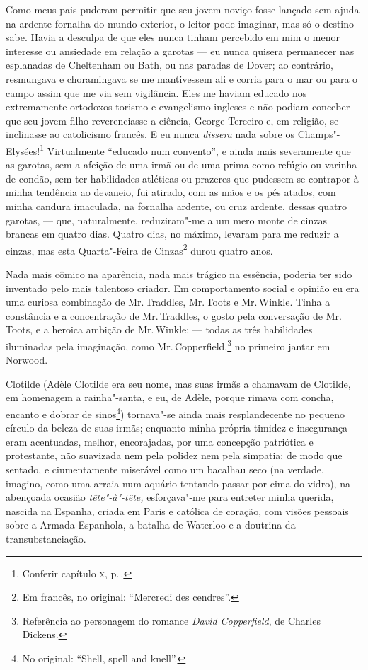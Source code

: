 Como meus pais puderam permitir que seu jovem noviço fosse lançado
sem ajuda na ardente fornalha do mundo exterior, o leitor pode imaginar,
mas só o destino sabe. Havia a desculpa de que eles nunca tinham
percebido em mim o menor interesse ou ansiedade em relação a garotas ---
eu nunca quisera permanecer nas esplanadas de Cheltenham ou Bath, ou nas
paradas de Dover; ao contrário, resmungava e choramingava se me
mantivessem ali e corria para o mar ou para o campo assim que me via sem
vigilância. Eles me haviam educado nos extremamente ortodoxos torismo e
evangelismo ingleses e não podiam conceber que seu jovem filho
reverenciasse a ciência, George Terceiro e, em religião, se inclinasse
ao catolicismo francês. E eu nunca \textit{dissera} nada sobre os
Champs"-Elysées!\footnote{Conferir capítulo \textsc{x}, p.\,\pageref{201}.}
Virtualmente ``educado num convento'', e ainda mais severamente que as
garotas, sem a afeição de uma irmã ou de uma prima como refúgio ou
varinha de condão, sem ter habilidades atléticas ou prazeres que
pudessem se contrapor à minha tendência ao devaneio, fui atirado, com as
mãos e os pés atados, com minha candura imaculada, na fornalha ardente,
ou cruz ardente, dessas quatro garotas, --- que, naturalmente,
reduziram"-me a um mero monte de cinzas brancas em quatro dias. Quatro
dias, no máximo, levaram para me reduzir a cinzas, mas esta Quarta"-Feira
de Cinzas\footnote{Em francês, no original: ``Mercredi des cendres''.} durou quatro anos.

Nada mais cômico na aparência, nada mais trágico na essência, poderia
ter sido inventado pelo mais talentoso criador. Em comportamento social
e opinião eu era uma curiosa combinação de Mr.\,Traddles, Mr.\,Toots e Mr.\,Winkle. Tinha a constância e a concentração de Mr.\,Traddles, o gosto pela
conversação de Mr.\,Toots, e a heroica ambição de Mr.\,Winkle; --- todas as
três habilidades iluminadas pela imaginação, como Mr.\,Copperfield,\footnote{Referência ao personagem do romance \textit{David
  Copperfield}, de Charles Dickens.} no primeiro jantar
em Norwood.

Clotilde (Adèle Clotilde era seu nome, mas suas irmãs a chamavam de \label{207}
Clotilde, em homenagem a rainha"-santa, e eu, de Adèle, porque rimava com
concha, encanto e dobrar de sinos\footnote{No original: ``Shell, spell
  and knell''.}) tornava"-se ainda mais resplandecente no
pequeno círculo da beleza de suas irmãs; enquanto minha própria timidez
e insegurança eram acentuadas, melhor, encorajadas, por uma concepção
patriótica e protestante, não suavizada nem pela polidez nem pela
simpatia; de modo que sentado, e ciumentamente miserável como um
bacalhau seco (na verdade, imagino, como uma arraia num aquário tentando
passar por cima do vidro), na abençoada ocasião \textit{tête"-à"-tête,}
esforçava"-me para entreter minha querida, nascida na Espanha, criada em
Paris e católica de coração, com visões pessoais sobre a Armada
Espanhola, a batalha de Waterloo e a doutrina da transubstanciação.

